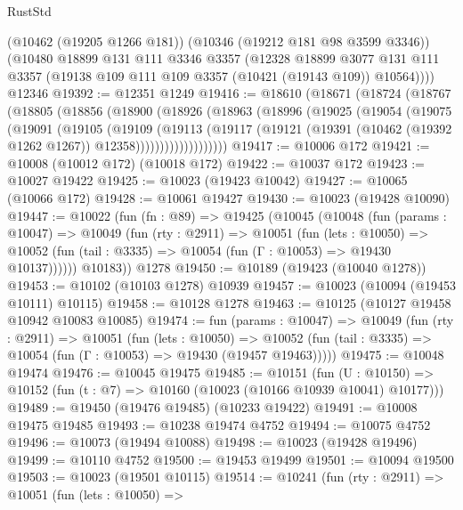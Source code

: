 \begin{lexlean}{RustStd}
\begin{coremodule}
      (@10462 (@19205 @1266 @181))
      (@10346 (@19212 @181 @98 @3599 @3346))
      (@10480
        @18899
        @131
        @111
        @3346
        @3357
        (@12328
          @18899
          @3077
          @131
          @111
          @3357
          (@19138 @109 @111 @109 @3357 (@10421 (@19143 @109)) @10564))))
    @12346
@19392 := @12351 @1249
@19416 := @18610
    (@18671
      (@18724
        (@18767
          (@18805
            (@18856
              (@18900
                (@18926
                  (@18963
                    (@18996
                      (@19025
                        (@19054
                          (@19075
                            (@19091
                              (@19105
                                (@19109
                                  (@19113
                                    (@19117
                                      (@19121
                                        (@19391
                                          (@10462 (@19392 @1262 @1267))
                                          @12358)))))))))))))))))))
@19417 := @10006 @172
@19421 := @10008 (@10012 @172) (@10018 @172)
@19422 := @10037 @172
@19423 := @10027 @19422
@19425 := @10023 (@19423 @10042)
@19427 := @10065 (@10066 @172)
@19428 := @10061 @19427
@19430 := @10023 (@19428 @10090)
@19447 := @10022
    (fun (fn : @89) =>
    @19425
      (@10045
        (@10048
          (fun (params : @10047) =>
          @10049
            (fun (rty : @2911) =>
            @10051
              (fun (lets : @10050) =>
              @10052 (fun (tail : @3335) => @10054 (fun (Γ : @10053) => @19430 @10137))))))
        @10183))
    @1278
@19450 := @10189 (@19423 (@10040 @1278))
@19453 := @10102 (@10103 @1278) @10939
@19457 := @10023 (@10094 (@19453 @10111) @10115)
@19458 := @10128 @1278
@19463 := @10125 (@10127 @19458 @10942 @10083 @10085)
@19474 := fun (params : @10047) =>
  @10049
    (fun (rty : @2911) =>
    @10051
      (fun (lets : @10050) =>
      @10052 (fun (tail : @3335) => @10054 (fun (Γ : @10053) => @19430 (@19457 @19463)))))
@19475 := @10048 @19474
@19476 := @10045 @19475
@19485 := @10151
    (fun (U : @10150) => @10152 (fun (t : @7) => @10160 (@10023 (@10166 @10939 @10041) @10177)))
@19489 := @19450 (@19476 @19485) (@10233 @19422)
@19491 := @10008 @19475 @19485
@19493 := @10238 @19474 @4752
@19494 := @10075 @4752
@19496 := @10073 (@19494 @10088)
@19498 := @10023 (@19428 @19496)
@19499 := @10110 @4752
@19500 := @19453 @19499
@19501 := @10094 @19500
@19503 := @10023 (@19501 @10115)
@19514 := @10241
    (fun (rty : @2911) =>
    @10051
      (fun (lets : @10050) =>

\end{coremodule}
\end{lexlean}
